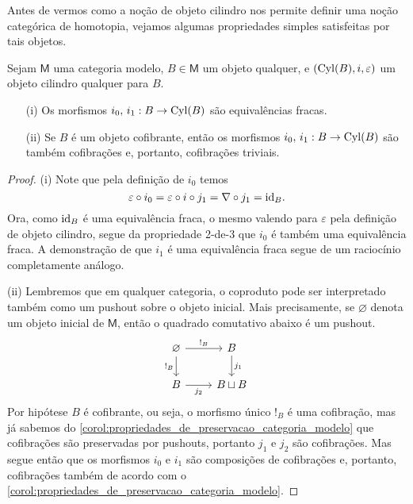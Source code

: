 Antes de vermos como a noção de objeto cilindro nos permite definir uma noção categórica de homotopia, vejamos algumas propriedades simples satisfeitas por tais objetos.

\begin{lema}\label{lema:props_obj_cilindro}
  Sejam $\mathsf{M}$ uma categoria modelo, $B \in \mathsf{M}$ um objeto qualquer, e $(\mathrm{Cyl}(B),i,\varepsilon)$ um objeto cilindro qualquer para $B$.
  \begin{enumerate}
  \item[(i)] Os morfismos $i_{0},\, i_{1}: B \to \mathrm{Cyl}(B)$ são equivalências fracas.
    
  \item[(ii)] Se $B$ é um objeto cofibrante, então os morfismos $i_{0},\, i_{1}: B \to \mathrm{Cyl}(B)$ são também cofibrações e, portanto, cofibrações triviais.
  \end{enumerate}
\end{lema}

\begin{proof}
  (i) Note que pela definição de $i_{0}$ temos
  \begin{displaymath}
    \varepsilon \circ i_{0} = \varepsilon \circ i \circ j_{1} = \nabla \circ j_{1} = \mathrm{id}_{B}.
  \end{displaymath}
  Ora, como $\mathrm{id}_{B}$ é uma equivalência fraca, o mesmo valendo para $\varepsilon$ pela definição de objeto cilindro, segue da propriedade 2-de-3 que $i_{0}$ é também uma equivalência fraca.
  A demonstração de que $i_{1}$ é uma equivalência fraca segue de um raciocínio completamente análogo.

  \smallskip
  (ii) Lembremos que em qualquer categoria, o coproduto pode ser interpretado também como um pushout sobre o objeto inicial.
  Mais precisamente, se $\varnothing$ denota um objeto inicial de $\mathsf{M}$, então o quadrado comutativo abaixo é um pushout.
  \begin{displaymath}
    \begin{tikzcd}
      \varnothing
      \arrow[r, "!_{B}"]
      \arrow[d, "!_{B}" swap]
      & B
      \arrow[d, "j_{1}"]
      \\ B
      \arrow[r, "j_{2}" swap]
      & B \sqcup B
    \end{tikzcd}
  \end{displaymath}
  Por hipótese $B$ é cofibrante, ou seja, o morfismo único $!_{B}$ é uma cofibração, mas já sabemos do \cref{corol:propriedades_de_preservacao_categoria_modelo} que cofibrações são preservadas por pushouts, portanto $j_{1}$ e $j_{2}$ são cofibrações.
  Mas segue então que os morfismos $i_{0}$ e $i_{1}$ são composições de cofibrações e, portanto, cofibrações também de acordo com o \cref{corol:propriedades_de_preservacao_categoria_modelo}.
\end{proof}

